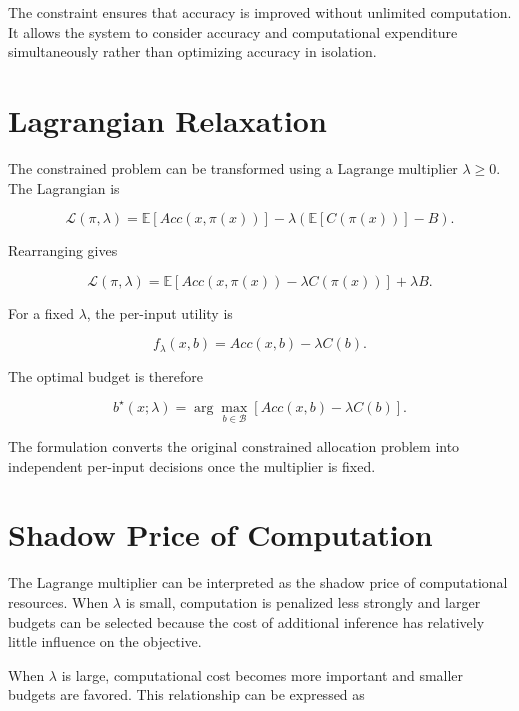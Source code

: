 \documentclass[12pt,a4paper,titlepage]{report}
\begin{document}
The constraint ensures that accuracy is improved without unlimited computation. It allows the system to consider accuracy and computational expenditure simultaneously rather than optimizing accuracy in isolation.

\section{Lagrangian Relaxation}

The constrained problem can be transformed using a Lagrange multiplier $\lambda\geq0$. The Lagrangian is

\begin{equation}
\mathcal{L}(\pi,\lambda)
=
\mathbb{E}
[Acc(x,\pi(x))]
-
\lambda
\left(
\mathbb{E}[C(\pi(x))]-B
\right).
\end{equation}

Rearranging gives

\begin{equation}
\mathcal{L}(\pi,\lambda)
=
\mathbb{E}
[
Acc(x,\pi(x))
-\lambda C(\pi(x))
]
+\lambda B.
\end{equation}

For a fixed $\lambda$, the per-input utility is

\begin{equation}
f_\lambda(x,b)
=
Acc(x,b)-\lambda C(b).
\end{equation}

The optimal budget is therefore

\begin{equation}
b^\star(x;\lambda)
=
\arg\max_{b\in\mathcal{B}}
[
Acc(x,b)-\lambda C(b)
].
\end{equation}

The formulation converts the original constrained allocation problem into independent per-input decisions once the multiplier is fixed.

\section{Shadow Price of Computation}

The Lagrange multiplier can be interpreted as the shadow price of computational resources. When $\lambda$ is small, computation is penalized less strongly and larger budgets can be selected because the cost of additional inference has relatively little influence on the objective.

When $\lambda$ is large, computational cost becomes more important and smaller budgets are favored. This relationship can be expressed as
\end{document}
